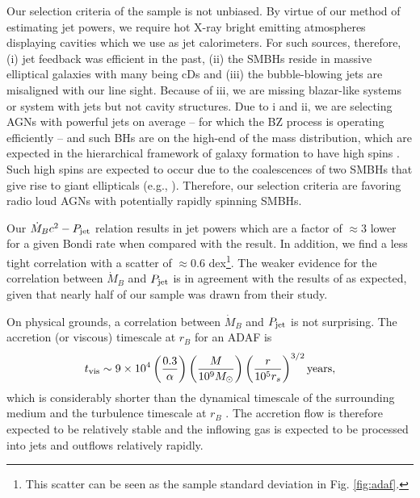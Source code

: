 \documentclass[useAMS,usenatbib]{mn2e}
\begin{document}
Our selection criteria of the sample is not unbiased. By virtue of our method of estimating jet powers, we require hot X-ray bright emitting atmospheres displaying cavities which we use as jet calorimeters. For such sources, therefore, (i) jet feedback was efficient in the past, (ii) the SMBHs reside in massive elliptical galaxies with many being cDs and (iii) the bubble-blowing jets are misaligned with our line sight. Because of iii, we are missing blazar-like systems or system with jets but not cavity structures. Due to i and ii, we are selecting AGNs with powerful jets on average -- for which the BZ process is operating efficiently -- and such BHs are on the high-end of the mass distribution, which are expected in the hierarchical framework of galaxy formation to have high spins \citep{Volonteri07}. Such high spins are expected to occur due to the coalescences of two SMBHs that give rise to giant ellipticals (e.g., \citealt{Hughes03}). Therefore, our selection criteria are favoring radio loud AGNs with potentially rapidly spinning SMBHs. 

\begin{comment}
Warn that sample is not complete or unbiased
- by virtue of our method of estimating jet powers, we are selecting sources with visible/strong X-ray cavity emission, favoring jets misaligned with our line of sight as blazars...
- as a consequence, jet feedback was efficient in the past
- so we are selecting the sources with powerful jets, with the most massive holes in the most massive galaxies (cDs)
==> presumably they are favored to have the most rapidly spinning black holes which would favor BZ effect
\end{comment}


Our $\dot{M}_B c^2 - P_{\rm jet}$ relation results in jet powers which are a factor of $\approx 3$ lower for a given Bondi rate when compared with the \cite{Allen06} result. In addition, we find a  less tight correlation with a scatter of $\approx 0.6$ dex\footnote{This scatter can be seen as the sample standard deviation in Fig. \ref{fig:adaf}.}. The weaker evidence for the correlation between $\dot{M}_B$ and $P_{\rm jet}$  is in agreement with the results of \cite{Russell13} as expected, given that nearly half of our sample was drawn from their study. 

On physical grounds, a correlation between $\dot{M}_B$ and  $P_{\rm jet}$ is not surprising. The accretion (or viscous) timescale at $r_B$ for an ADAF is
\begin{equation}
t_{\rm vis} \sim 9 \times 10^4 \left( \frac{0.3}{\alpha} \right) \left( \frac{M}{10^9 M_\odot} \right) \left( \frac{r}{10^5 r_s} \right)^{3/2} {\rm years},
\end{equation}
which is considerably shorter than the dynamical timescale of the surrounding medium and the turbulence timescale at $r_B$ \citep{Narayan11}. The accretion flow is therefore expected to be relatively stable and the inflowing gas is expected to be processed into jets and outflows relatively rapidly.
\end{document}

